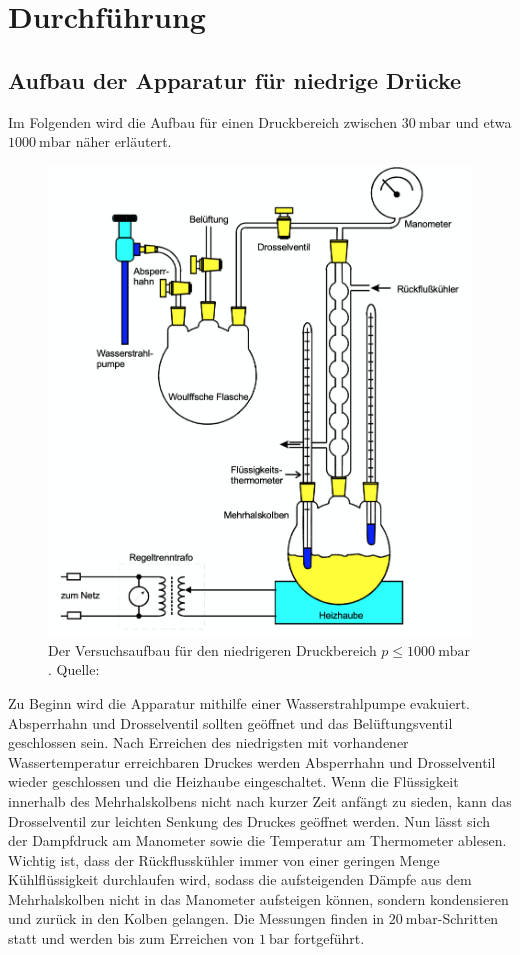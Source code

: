 \section{Durchführung}
  \subsection{Aufbau der Apparatur für niedrige Drücke}
    Im Folgenden wird die Aufbau für einen Druckbereich zwischen $\SI{30}{\milli\bar}$ und etwa $\SI{1000}{\milli\bar}$ näher
    erläutert.
    \begin{figure}
      \centering
      \includegraphics[scale=0.5]{Content/apparaturniedrige.png}
      \caption{Der Versuchsaufbau für den niedrigeren Druckbereich $p \leq \SI{1000}{\milli\bar}$. Quelle: \cite{AP01}}
      \label{fig:niedrigedrücke}
    \end{figure}
    Zu Beginn wird die Apparatur mithilfe einer Wasserstrahlpumpe evakuiert. Absperrhahn und Drosselventil sollten geöffnet und
    das Belüftungsventil geschlossen sein. Nach Erreichen des niedrigsten mit vorhandener Wassertemperatur erreichbaren Druckes
    werden Absperrhahn und Drosselventil wieder geschlossen und die Heizhaube eingeschaltet. Wenn die Flüssigkeit innerhalb
    des Mehrhalskolbens nicht nach kurzer Zeit anfängt zu sieden, kann das Drosselventil zur leichten Senkung des Druckes
    geöffnet werden. Nun lässt sich der Dampfdruck am Manometer sowie die Temperatur am Thermometer ablesen. Wichtig ist, dass
    der Rückflusskühler immer von einer geringen Menge Kühlflüssigkeit durchlaufen wird, sodass die aufsteigenden Dämpfe aus dem
    Mehrhalskolben nicht in das Manometer aufsteigen können, sondern kondensieren und zurück in den Kolben gelangen.
    Die Messungen finden in $\SI{20}{\milli\bar}$-Schritten statt und werden bis zum Erreichen von $\SI{1}{\bar}$ fortgeführt.
